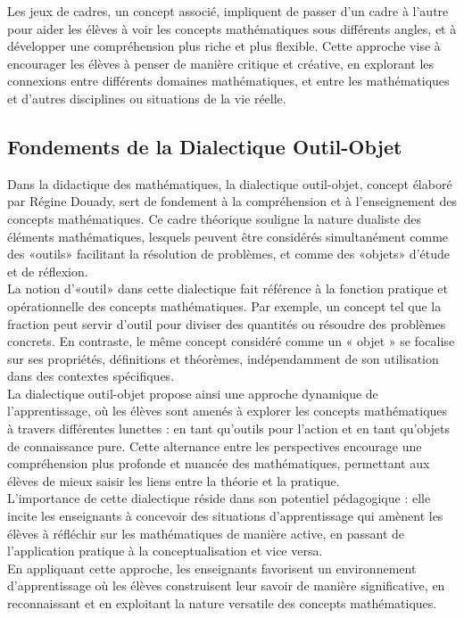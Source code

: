 Les jeux de cadres,
un concept associé,
impliquent de passer d'un cadre à l'autre pour aider les élèves à voir les concepts mathématiques sous différents angles,
et à développer une compréhension plus riche et plus flexible.
Cette approche vise à encourager les élèves à penser de manière critique et créative,
en explorant les connexions entre différents domaines mathématiques,
et entre les mathématiques et d'autres disciplines ou situations de la vie réelle.

\subsection{Fondements de la Dialectique Outil-Objet}

Dans la didactique des mathématiques,
la dialectique outil-objet,
concept élaboré par Régine Douady,
sert de fondement à la compréhension et à l'enseignement des concepts mathématiques.
Ce cadre théorique souligne la nature dualiste des éléments mathématiques,
lesquels peuvent être considérés simultanément comme des «outils» facilitant la résolution de problèmes,
et comme des «objets» d'étude et de réflexion.\\

La notion d'«outil» dans cette dialectique fait référence à la fonction pratique et opérationnelle des concepts mathématiques.
Par exemple,
un concept tel que la fraction peut servir d'outil pour diviser des quantités ou résoudre des problèmes concrets.
En contraste,
le même concept considéré comme un « objet » se focalise sur ses propriétés,
définitions et théorèmes,
indépendamment de son utilisation dans des contextes spécifiques.\\

La dialectique outil-objet propose ainsi une approche dynamique de l'apprentissage,
où les élèves sont amenés à explorer les concepts mathématiques à travers différentes lunettes :
en tant qu'outils pour l'action et en tant qu'objets de connaissance pure.
Cette alternance entre les perspectives encourage une compréhension plus profonde et nuancée des mathématiques,
permettant aux élèves de mieux saisir les liens entre la théorie et la pratique.\\

L'importance de cette dialectique réside dans son potentiel pédagogique :
elle incite les enseignants à concevoir des situations d'apprentissage qui amènent les élèves à réfléchir sur les mathématiques de manière active,
en passant de l'application pratique à la conceptualisation et vice versa.\\
En appliquant cette approche,
les enseignants favorisent un environnement d'apprentissage où les élèves construisent leur savoir de manière significative,
en reconnaissant et en exploitant la nature versatile des concepts mathématiques.

